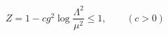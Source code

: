 \begin{equation}
Z=1-cg^2\log{\frac{\Lambda^2}{\mu^2}}\leq 1, \qquad (c>0)\label{eqn:oneloop}
\end{equation}

